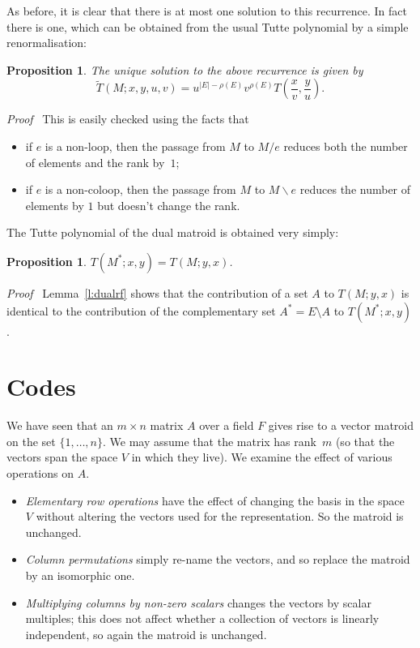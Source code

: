 \documentclass[12pt]{article}
\newtheorem{proposition}[theorem]{Proposition}
\newcommand{\head}[1]{\medbreak\noindent\textit{#1}\ }
\begin{document}
As before, it is clear that there is at most one solution to this
recurrence. In fact there is one, which can be obtained from the
usual Tutte polynomial by a simple renormalisation:

\begin{proposition}
The unique solution to the above recurrence is given by
\[\tilde T(M;x,y,u,v)=u^{|E|-\rho(E)}v^{\rho(E)}
T\left(\frac{x}{v},\frac{y}{u}\right).\]
\label{p:gentutte}
\end{proposition}

\head{Proof} This is easily checked using the facts that
\begin{itemize}
\item if $e$ is a non-loop, then the passage from $M$ to $M/e$ reduces both
the number of elements and the rank by~$1$;
\item if $e$ is a non-coloop, then the passage from $M$ to $M\backslash e$
reduces the number of elements by $1$ but doesn't change the rank.
\end{itemize}

\medbreak

The Tutte polynomial of the dual matroid is obtained very simply:

\begin{proposition}
$T(M^*;x,y)=T(M;y,x)$.
\end{proposition}

\head{Proof} Lemma~\ref{l:dualrf} shows that the contribution of a set
$A$ to $T(M;y,x)$ is identical to the contribution of the complementary
set $A^*=E\setminus A$ to $T(M^*;x,y)$.

\section{Codes}

We have seen that an $m\times n$ matrix $A$ over a field $F$ gives
rise to a vector matroid on the set $\{1, \ldots, n\}$. We may
assume that the matrix has rank~$m$ (so that the vectors span the
space $V$ in which they live). We examine the effect
of various operations on $A$.
\begin{itemize}
\item\emph{Elementary row operations} have the effect of changing
the basis in the space $V$ without altering the vectors used for
the representation. So the matroid is unchanged.
\item\emph{Column permutations} simply re-name the vectors, and so
replace the matroid by an isomorphic one.
\item\emph{Multiplying columns by non-zero scalars} changes the
vectors by scalar multiples; this does not affect whether a
collection of vectors is linearly independent, so again the
matroid is unchanged.
\end{itemize}
\end{document}
